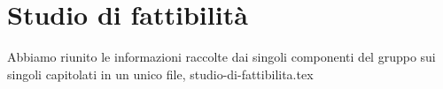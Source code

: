 \documentclass{article}
\begin{document}
\section{Studio di fattibilità}
\label{sec:studio_di_fattibilità}

Abbiamo riunito le informazioni raccolte dai singoli componenti del gruppo sui singoli capitolati in un unico file, studio-di-fattibilita.tex
\end{document}
